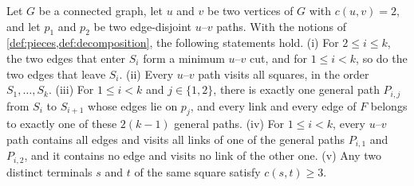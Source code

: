 \begin{theorem}
\label{thm:structure}
Let $G$ be a connected graph, let $u$ and $v$ be two vertices of $G$ with $c(u, v) = 2$, and let $p_1$ and $p_2$ be two edge-disjoint $u$--$v$ paths.
With the notions of \cref{def:pieces,def:decomposition}, the following statements hold.
(i) For $2 \leq i \leq k$, the two edges that enter $S_i$ form a minimum $u$--$v$ cut, and for $1 \leq i < k$, so do the two edges that leave $S_i$.
(ii) Every $u$--$v$ path visits all squares, in the order $S_1, \dots, S_k$.
(iii) For $1 \leq i < k$ and $j \in \{1, 2\}$, there is exactly one general path $P_{i,j}$ from $S_i$ to $S_{i+1}$ whose edges lie on $p_j$, and every link and every edge of $F$ belongs to exactly one of these $2(k - 1)$ general paths.
(iv) For $1 \leq i < k$, every $u$--$v$ path contains all edges and visits all links of one of the general paths $P_{i,1}$ and $P_{i,2}$, and it contains no edge and visits no link of the other one.
(v) Any two distinct terminals $s$ and $t$ of the same square satisfy $c(s, t) \geq 3$.
\end{theorem}

